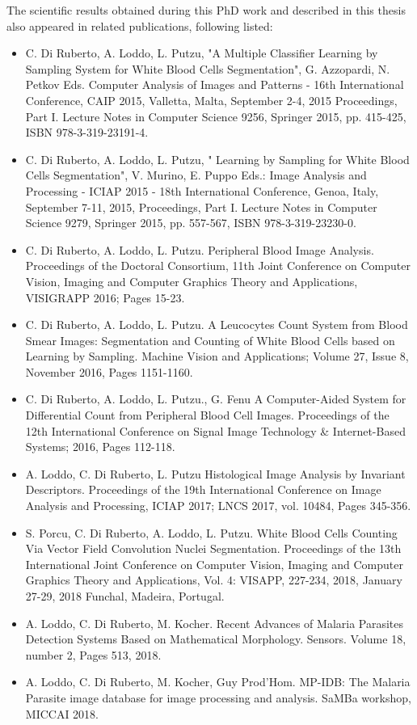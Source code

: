 \documentclass[final,a4paper,12pt,english]{UnicaPhdThesis3}
\begin{document}
The scientific results obtained during this PhD work and described in this thesis also appeared in related publications, following listed:
\begin{itemize}
\item C. Di Ruberto, A. Loddo, L. Putzu, "A Multiple Classifier Learning by Sampling System for White Blood Cells Segmentation", G. Azzopardi, N. Petkov Eds. Computer Analysis of Images and Patterns - 16th International Conference, CAIP 2015, Valletta, Malta, September 2-4, 2015 Proceedings, Part I. Lecture Notes in Computer Science 9256, Springer 2015, pp. 415-425, ISBN 978-3-319-23191-4.
\item C. Di Ruberto, A. Loddo, L. Putzu, " Learning by Sampling for White Blood Cells Segmentation", V. Murino, E. Puppo Eds.: Image Analysis and Processing - ICIAP 2015 - 18th International Conference, Genoa, Italy, September 7-11, 2015, Proceedings, Part I. Lecture Notes in Computer Science 9279, Springer 2015, pp. 557-567,  ISBN 978-3-319-23230-0. 
\item C. Di Ruberto, A. Loddo, L. Putzu. Peripheral Blood Image Analysis. Proceedings of the Doctoral Consortium, 11th Joint Conference on Computer Vision, Imaging and Computer Graphics Theory and Applications, VISIGRAPP 2016; Pages 15-23.
\item C. Di Ruberto, A. Loddo, L. Putzu. A Leucocytes Count System from Blood Smear Images: Segmentation and Counting of White Blood Cells based on Learning by Sampling. Machine Vision and Applications; Volume 27, Issue 8, November 2016, Pages 1151-1160.
\item C. Di Ruberto, A. Loddo, L. Putzu., G. Fenu A Computer-Aided System for Differential Count from Peripheral Blood Cell Images. Proceedings of the 12th International Conference on Signal Image Technology \& Internet-Based Systems; 2016, Pages 112-118.
\item A. Loddo, C. Di Ruberto, L. Putzu Histological Image Analysis by Invariant Descriptors. Proceedings of the 19th International Conference on Image Analysis and Processing, ICIAP 2017; LNCS 2017, vol. 10484, Pages 345-356.
\item S. Porcu, C. Di Ruberto, A. Loddo, L. Putzu. White Blood Cells Counting Via Vector Field Convolution Nuclei Segmentation. Proceedings of the 13th International Joint Conference on Computer Vision, Imaging and Computer Graphics Theory and Applications, Vol. 4: VISAPP, 227-234, 2018, January 27-29, 2018 Funchal, Madeira, Portugal.
\item A. Loddo, C. Di Ruberto, M. Kocher. Recent Advances of Malaria Parasites Detection Systems Based on Mathematical Morphology. Sensors. Volume 18, number 2, Pages 513, 2018.
\item A. Loddo, C. Di Ruberto, M. Kocher, Guy Prod'Hom. MP-IDB: The Malaria Parasite image database for image processing and analysis. SaMBa workshop, MICCAI 2018.
\end{itemize}
\end{document}
